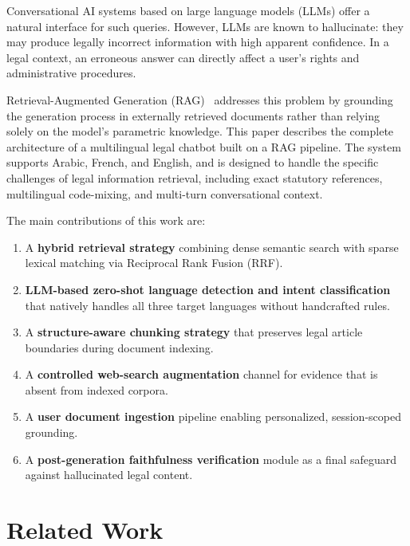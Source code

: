 \documentclass[12pt, a4paper]{article}
\begin{document}
Conversational AI systems based on large language models (LLMs) offer a
natural interface for such queries. However, LLMs are known to hallucinate:
they may produce legally incorrect information with high apparent confidence.
In a legal context, an erroneous answer can directly affect a user's rights
and administrative procedures.

Retrieval-Augmented Generation (RAG)~\cite{lewis2020rag} addresses this problem
by grounding the generation process in externally retrieved documents rather than
relying solely on the model's parametric knowledge. This paper describes the
complete architecture of a multilingual legal chatbot built on a RAG pipeline.
The system supports Arabic, French, and English, and is designed to handle the
specific challenges of legal information retrieval, including exact statutory
references, multilingual code-mixing, and multi-turn conversational context.

\medskip
The main contributions of this work are:

\begin{enumerate}[leftmargin=1.8em, itemsep=0.3em]
  \item A \textbf{hybrid retrieval strategy} combining dense semantic search with sparse
        lexical matching via Reciprocal Rank Fusion (RRF).
  \item \textbf{LLM-based zero-shot language detection and intent classification}
        that natively handles all three target languages without handcrafted rules.
  \item A \textbf{structure-aware chunking strategy} that preserves legal article
        boundaries during document indexing.
  \item A \textbf{controlled web-search augmentation} channel for evidence that is
        absent from indexed corpora.
  \item A \textbf{user document ingestion} pipeline enabling personalized,
        session-scoped grounding.
  \item A \textbf{post-generation faithfulness verification} module as a final safeguard
        against hallucinated legal content.
\end{enumerate}

\section{Related Work}
\end{document}
